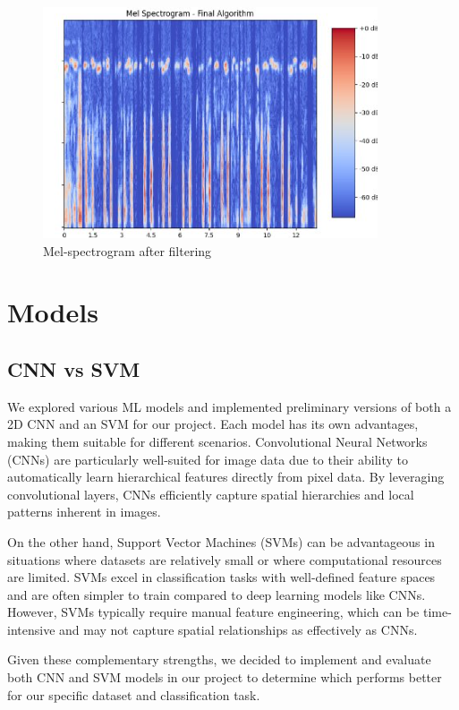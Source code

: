 \documentclass[conference]{IEEEtran}
\begin{document}
\begin{figure}
    \centering
    \includegraphics[width=0.8\linewidth]{Images/image2.png}
    \caption{Mel-spectrogram after filtering}
    \label{fig:after-filtering}
\end{figure}





\section{Models}



\subsection{CNN vs SVM}
We explored various ML models and implemented preliminary versions of both a 2D CNN and an SVM for our project. Each model has its own advantages, making them suitable for different scenarios. Convolutional Neural Networks (CNNs) are particularly well-suited for image data due to their ability to automatically learn hierarchical features directly from pixel data. By leveraging convolutional layers, CNNs efficiently capture spatial hierarchies and local patterns inherent in images.

On the other hand, Support Vector Machines (SVMs) can be advantageous in situations where datasets are relatively small or where computational resources are limited. SVMs excel in classification tasks with well-defined feature spaces and are often simpler to train compared to deep learning models like CNNs. However, SVMs typically require manual feature engineering, which can be time-intensive and may not capture spatial relationships as effectively as CNNs.

Given these complementary strengths, we decided to implement and evaluate both CNN and SVM models in our project to determine which performs better for our specific dataset and classification task.
\end{document}
